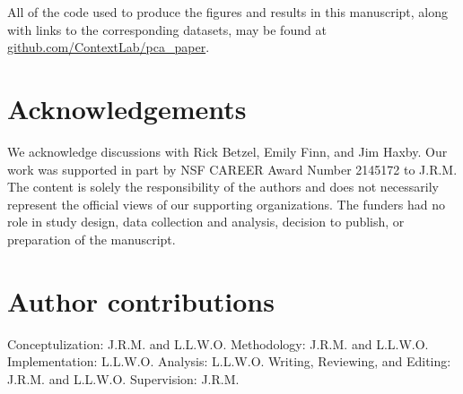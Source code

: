\documentclass[english, 11pt]{article}
\begin{document}
All of the code used to produce the figures and results in this manuscript,
along with links to the corresponding datasets, may be found at 
\href{https://github.com/ContextLab/pca_paper}{github.com/ContextLab/pca\_paper}.

\section*{Acknowledgements} 

We acknowledge discussions with Rick Betzel, Emily Finn, and Jim Haxby. Our
work was supported in part by NSF CAREER Award Number 2145172 to J.R.M. The
content is solely the responsibility of the authors and does not necessarily
represent the official views of our supporting organizations. The funders had
no role in study design, data collection and analysis, decision to publish, or
preparation of the manuscript.


\section*{Author contributions} 

Conceptulization: J.R.M. and L.L.W.O. Methodology: J.R.M. and L.L.W.O.
Implementation: L.L.W.O. Analysis: L.L.W.O. Writing, Reviewing, and Editing:
J.R.M. and L.L.W.O. Supervision: J.R.M.



\end{document}
